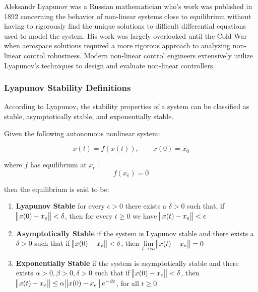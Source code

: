 Aleksandr Lyapunov was a Russian mathematician who's work was published in 1892 \cite{lyapunov1892general} concerning the behavior of non-linear systems close to equilibrium without having to rigorously find the unique solutions to difficult differential equations used to model the system.  His work was largely overlooked until the Cold War when aerospace solutions required a more rigorous approach to analyzing non-linear control robustness.  Modern non-linear control engineers extensively utilize Lyapunov's techniques to design and evaluate non-linear controllers.

\subsubsection{Lyapunov Stability Definitions}

According to Lyapunov, the stability properties of a system can be classified as stable, asymptotically stable, and exponentially stable.

Given the following autonomous nonlinear system:

 \begin{equation}
\dot{x}(t)=f(x(t)), \qquad x(0)=x_0
\end{equation}

where $f$ has equilibrium at $x_e$ :
 \begin{equation}
f(x_e) = 0
\end{equation}

then the equilibrium is said to be:
\begin{enumerate}
 \item \textbf{Lyapunov Stable} \newline
 for every $\epsilon > 0$ there exists a $\delta > 0$ such that, if \: $\norm{x(0) - x_e} < \delta$, then for every $t \geq 0$ we have  $ \norm{x(t) - x_e} < \epsilon$ 
 \item \textbf{Asymptotically Stable} \newline
 if the system is Lyapunov stable and there exists a $\delta > 0$ such that if \: $\norm{x(0) - x_e}  < \delta$, then $\displaystyle \lim_{t\to \infty} \norm{x(t)-x_e} =0$
 \item \textbf{Exponentially Stable} \newline
 if the system is asymptotically stable and there exists $\alpha > 0, \beta > 0, \delta > 0$ such that if $\norm{x(0)-x_e}<\delta$, then \:$\norm{x(t)-x_e} \leq \alpha \norm{x(0)-x_e} e^{-\beta t}$, for all $t \geq 0$
\end{enumerate}

